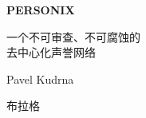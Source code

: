 \thispagestyle{empty}
\begin{center}
  {\sffamily\bfseries\fontsize{34}{40}\selectfont PERSONIX\par}
  \vspace{2.2em}
  {\rmfamily\large 一个不可审查、不可腐蚀的\\[0.25em]
   去中心化声誉网络\par}
\end{center}
\begin{center}
  {\rmfamily\Large Pavel Kudrna\par}
  \vspace{0.45em}
  {\rmfamily\small 布拉格\quad\textbullet{}\par}
\end{center}
\clearpage
